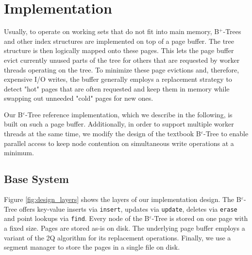 
\chapter{Implementation}\label{chapter:implementation}
Usually, to operate on working sets that do not fit into main memory, B$^+$-Trees and other index structures are implemented on top of a page buffer. The tree structure is then logically mapped onto these pages. This lets the page buffer evict currently unused parts of the tree for others that are requested by worker threads operating on the tree. To minimize these page evictions and, therefore, expensive I/O writes, the buffer generally employs a replacement strategy to detect "hot" pages that are often requested and keep them in memory while swapping out unneeded "cold" pages for new ones.

Our B$^\varepsilon$-Tree reference implementation, which we describe in the following, is built on such a page buffer. Additionally, in order to support multiple worker threads at the same time, we modify the design of the textbook B$^\varepsilon$-Tree to enable parallel access to keep node contention on simultaneous write operations at a minimum.

\section{Base System}
Figure \ref{fig:design_layers} shows the layers of our implementation design. The B$^\varepsilon$-Tree offers key-value inserts via \texttt{insert}, updates via \texttt{update}, deletes via \texttt{erase} and point lookups via \texttt{find}. Every node of the B$^\varepsilon$-Tree is stored on one page with a fixed size. Pages are stored as-is on disk. The underlying page buffer employs a variant of the 2Q algorithm \cite{source_2Q} for its replacement operations. Finally, we use a segment manager to store the pages in a single file on disk.

